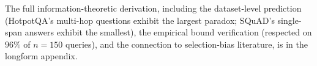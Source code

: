 The full information-theoretic derivation, including the dataset-level
prediction (HotpotQA's multi-hop questions exhibit the largest
paradox; SQuAD's single-span answers exhibit the smallest), the
empirical bound verification (respected on $96\%$ of $n=150$
queries), and the connection to selection-bias literature, is in the
longform appendix.
